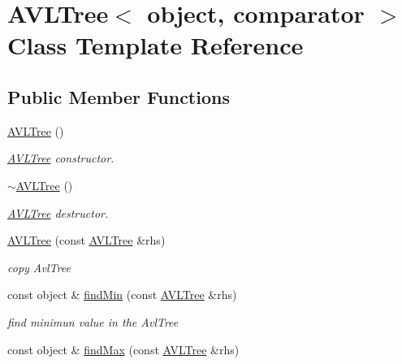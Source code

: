 \hypertarget{class_a_v_l_tree}{}\section{A\+V\+L\+Tree$<$ object, comparator $>$ Class Template Reference}
\label{class_a_v_l_tree}
\subsection*{Public Member Functions}
\begin{DoxyCompactItemize}
\item 
\hypertarget{class_a_v_l_tree_a968e0b2fa5dd036f41563301830e0cad}{}\label{class_a_v_l_tree_a968e0b2fa5dd036f41563301830e0cad} 
\hyperlink{class_a_v_l_tree_a968e0b2fa5dd036f41563301830e0cad}{A\+V\+L\+Tree} ()
\begin{DoxyCompactList}\small\item\em \hyperlink{class_a_v_l_tree}{A\+V\+L\+Tree} constructor. \end{DoxyCompactList}\item 
\hypertarget{class_a_v_l_tree_af147fef706e86e66e92f6e0d71a90f9c}{}\label{class_a_v_l_tree_af147fef706e86e66e92f6e0d71a90f9c} 
\hyperlink{class_a_v_l_tree_af147fef706e86e66e92f6e0d71a90f9c}{$\sim$\+A\+V\+L\+Tree} ()
\begin{DoxyCompactList}\small\item\em \hyperlink{class_a_v_l_tree}{A\+V\+L\+Tree} destructor. \end{DoxyCompactList}\item 
\hyperlink{class_a_v_l_tree_aa8aed3bae2f9006d2d8b91db22f78540}{A\+V\+L\+Tree} (const \hyperlink{class_a_v_l_tree}{A\+V\+L\+Tree} \&rhs)
\begin{DoxyCompactList}\small\item\em copy Avl\+Tree \end{DoxyCompactList}\item 
const object \& \hyperlink{class_a_v_l_tree_abb8296a20c0ab3fc8b172cb8c566cbd4}{find\+Min} (const \hyperlink{class_a_v_l_tree}{A\+V\+L\+Tree} \&rhs)
\begin{DoxyCompactList}\small\item\em find minimun value in the Avl\+Tree \end{DoxyCompactList}\item 
const object \& \hyperlink{class_a_v_l_tree_a72e12a134186842a034ee0e9c6a59ed6}{find\+Max} (const \hyperlink{class_a_v_l_tree}{A\+V\+L\+Tree} \&rhs)

\end{DoxyCompactItemize}
